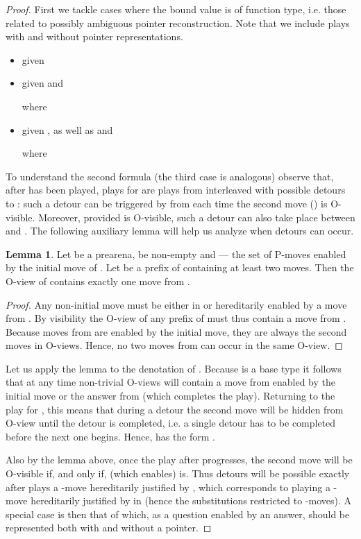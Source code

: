 \documentclass{CSML}
\theoremstyle{definition}\newtheorem{definition}[thm]{Definition}
\theoremstyle{definition}\newtheorem{example}[thm]{Example}
\theoremstyle{definition}\newtheorem{proposition}[thm]{Proposition}
\theoremstyle{definition}\newtheorem{lemma}[thm]{Lemma}
\theoremstyle{definition}\newtheorem{theorem}[thm]{Theorem}
\theoremstyle{definition}\newtheorem{corollary}[thm]{Corollary}
\theoremstyle{definition}\newtheorem{remark}[thm]{Remark}
\newcommand\nt[1]{#1}
\begin{document}
\begin{proof}
First we tackle cases where the bound value is of function type, i.e. those related to possibly ambiguous
pointer reconstruction. Note that we include plays with and without pointer representations.
\begin{itemize}
\item 
given 

\item 
given  and 

where  
\item 
given , as well as  and 

where  
\end{itemize}
To understand the second formula (the third case is analogous) observe that, after  has been played,
plays for  are plays from  interleaved with possible detours to :
such a detour can be triggered by   from  each time the second move () is O-visible. 
Moreover, provided  is O-visible,
such a detour can also take place between  and .
The following auxiliary lemma will help us analyze when detours can occur.
\begin{lemma}
Let  be a \nt{prearena},  be non-empty and   --- the set of P-moves enabled by 
the initial move of . Let  be a prefix of  containing at least two moves.
Then the O-view of  contains exactly one move from .
\end{lemma}
\begin{proof}
Any non-initial move must be either in  or hereditarily enabled by a move from .
By visibility the O-view of  any prefix of  must thus contain
a move from . Because moves from  are enabled by the initial move, they are
always the second moves in O-views. Hence, no two moves from  can occur in the same O-view.
\end{proof}
Let us apply the lemma to the denotation of . Because  is a base type
it follows that at any time non-trivial O-views will contain a move from  enabled
by the initial move or the answer from  (which completes the play).
Returning to the play for , this means that during a detour the second move
 will be hidden from O-view until the detour is completed, i.e.
a single detour has to be completed
before the next one begins. Hence,  has the form .

Also by the lemma above, once the play after  progresses, the second move  will be O-visible if, and only if,
 (which  enables) is. Thus detours will be possible exactly after  
plays a -move hereditarily justified by , which corresponds to  playing
a -move hereditarily justified by  in  (hence the substitutions  restricted
to -moves). A special case is then that of  which, as a question enabled by an answer, should be represented both with and without a pointer.


\end{proof}
\end{document}
